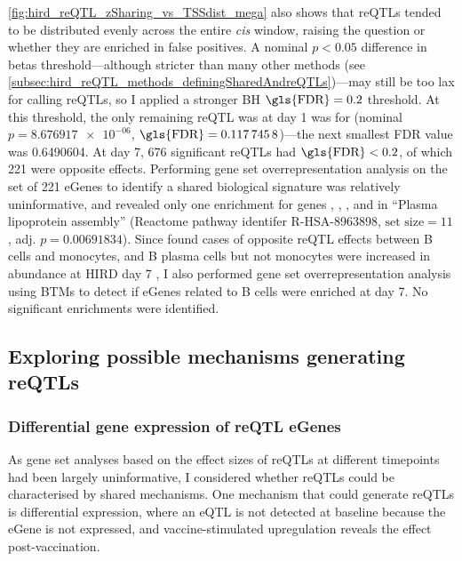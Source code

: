 \cref{fig:hird_reQTL_zSharing_vs_TSSdist_mega} also shows that \glspl{reQTL} tended to be distributed evenly across the entire \textit{cis} window,
raising the question or whether they are enriched in false positives.
A nominal $p < 0.05$ difference in betas threshold---although stricter than many other methods (see \cref{subsec:hird_reQTL_methods_definingSharedAndreQTLs})---may still be too lax for calling \glspl{reQTL},
so I applied a stronger \gls{BH} $\text{\gls{FDR}} = 0.2$ threshold.
At this threshold, the only remaining \gls{reQTL} was at day 1 was for  (nominal $p = \num{8.676917e-06}$, $\text{\gls{FDR}} = \num{0.1177458}$)---the next smallest \gls{FDR} value was \num{0.6490604}.
At day 7, 676 significant \glspl{reQTL} had $\text{\gls{FDR}} < 0.2$, of which 221 were opposite effects.
Performing gene set overrepresentation analysis on the set of 221 eGenes to identify a shared biological signature was relatively uninformative, 
and revealed only one enrichment for genes , , , and  in \enquote{Plasma lipoprotein assembly} (Reactome pathway identifer R-HSA-8963898, $\text{set size} = 11$, adj. $p = \num{0.00691834}$).
Since \textcite{fairfax2012GeneticsGeneExpression} found cases of opposite \gls{reQTL} effects between B cells and monocytes, and B plasma cells but not monocytes were increased in abundance at \gls{HIRD} day 7 \autocite{sobolev2016AdjuvantedInfluenzaH1N1Vaccination},
I also performed gene set overrepresentation analysis using \glspl{BTM} to detect if eGenes related to B cells were enriched at day 7.
No significant enrichments were identified.

\subsection{Exploring possible mechanisms generating reQTLs}

\subsubsection{Differential gene expression of reQTL eGenes}

As gene set analyses based on the effect sizes of \glspl{reQTL} at different timepoints had been largely uninformative,
I considered whether \glspl{reQTL} could be characterised by shared mechanisms.
One mechanism that could generate \glspl{reQTL} is differential expression, where an \gls{eQTL} is not detected at baseline because the eGene is not expressed, and vaccine-stimulated upregulation reveals the effect post-vaccination.

